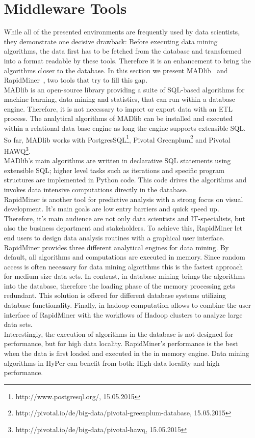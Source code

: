 \section{Middleware Tools}
While all of the presented environments are frequently used by data scientists, they demonstrate one decisive drawback: Before executing data mining algorithms, the data first has to be fetched from the database and transformed into a format readable by these tools. Therefore it is an enhancement to bring the algorithms closer to the database. In this section we present MADlib~\parencite{MADlib} and RapidMiner~\parencite{rapidminer}, two tools that try to fill this gap.
\\
MADlib is an open-source library providing a suite of SQL-based algorithms for machine learning, data mining and statistics, that can run within a database engine. Therefore, it is not necessary to import or export data with an ETL process. The analytical algorithms of MADlib can be installed and executed within a relational data base engine as long the engine supports extensible SQL. So far, MADlib works with PostgresSQL\footnote{http://www.postgresql.org/, 15.05.2015}, Pivotal Greenplum\footnote{http://pivotal.io/de/big-data/pivotal-greenplum-database, 15.05.2015} and Pivotal HAWQ\footnote{http://pivotal.io/de/big-data/pivotal-hawq, 15.05.2015}.
\\
MADlib's main algorithms are written in declarative SQL statements using extensible SQL; higher level tasks such as iterations and specific program structures are implemented in Python code. This code drives the algorithms and invokes data intensive computations directly in the database.
\\
RapidMiner is another tool for predictive analysis with a strong focus on visual development. It's main goals are low entry barriers and quick speed up. Therefore, it's main audience are not only data scientists and IT-specialists, but also the business department and stakeholders. To achieve this, RapidMiner let end users to design data analysis routines with a graphical user interface.
\\
RapidMiner provides three different analytical engines for data mining. By default, all algorithms and computations are executed in memory. Since random access is often necessary for data mining algorithms this is the fastest approach for medium size data sets. In contrast, in database mining brings the algorithms into the database, therefore the loading phase of the memory processing gets redundant. This solution is offered for different database systems utilizing database functionality. Finally, in hadoop computation allows to combine the user interface of RapidMiner with the workflows of Hadoop clusters to analyze large data sets.
\\
Interestingly, the execution of algorithms in the database is not designed for performance, but for high data locality. RapidMiner's performance is the best when the data is first loaded and executed in the in memory engine. Data mining algorithms in HyPer can benefit from both: High data locality and high performance.


